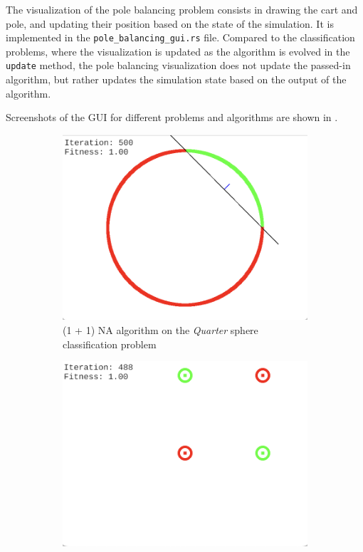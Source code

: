 The visualization of the pole balancing problem consists in drawing the cart and pole, and updating their position based on the state of the simulation.
It is implemented in the \texttt{pole\_balancing\_gui.rs} file. Compared to the classification problems, where the visualization is updated as the algorithm is evolved in the \texttt{update} method,
the pole balancing visualization does not update the passed-in algorithm, but rather updates the simulation state based on the output of the algorithm.

Screenshots of the GUI for different problems and algorithms are shown in .

\begin{figure}
    \centering
    \begin{subfigure}{0.5\textwidth}
        \centering
        \includegraphics[width=0.8\linewidth]{Pictures/oneplusonena_gui}
        \caption{(1 + 1) NA algorithm on the \textit{Quarter} sphere classification problem}
    \end{subfigure}%
    \hfill
    \begin{subfigure}{0.5\textwidth}
        \centering
        \includegraphics[width=0.8\linewidth]{Pictures/xor_gui}

\end{subfigure}
\end{figure}
